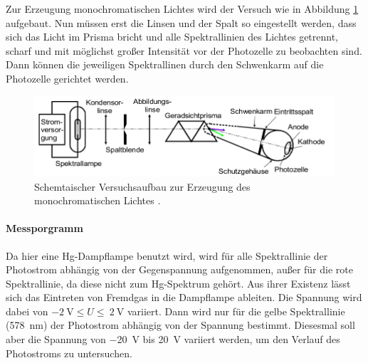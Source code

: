 Zur Erzeugung monochromatischen Lichtes wird der Versuch wie in Abbildung
\ref{fig:VAO} aufgebaut. Nun müssen erst die Linsen und der Spalt so eingestellt
werden, dass sich das Licht im Prisma bricht und alle Spektrallinien des Lichtes
getrennt, scharf und mit möglichst großer Intensität vor der Photozelle zu beobachten
sind. Dann können die jeweiligen Spektrallinen durch den Schwenkarm auf die
Photozelle gerichtet werden.

\begin{figure}
  \centering
  \includegraphics[height=3cm]{logos/VAOptisch.png}
  \caption{Schemtaischer Versuchsaufbau zur Erzeugung des monochromatischen Lichtes \cite{Anleitung}.}
  \label{fig:VAO}
\end{figure}

\paragraph{Messporgramm}
Da hier eine Hg-Dampflampe benutzt wird, wird für alle Spektrallinie der
Photostrom abhängig von der Gegenspannung aufgenommen, außer für die rote Spektrallinie, da diese nicht zum Hg-Spektrum gehört. Aus ihrer Existenz lässt sich das Eintreten von Fremdgas in die Dampflampe ableiten.
Die Spannung wird dabei von $ \SI{-2}{\volt} \leq U \leq \ \SI{2}{\volt}$ variiert.
Dann wird nur für die gelbe Spektrallinie (\SI{578}{\nano\meter}) der Photostrom
abhängig von der Spannung bestimmt. Diesesmal soll aber die Spannung von
\SI{-20}{\volt} bis \SI{20}{\volt} variiert werden, um den Verlauf des Photostroms zu untersuchen.
